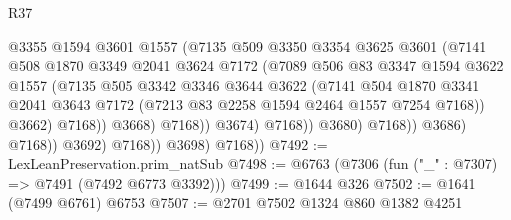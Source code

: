 \begin{lexlean}{R37}
\begin{coremodule}
                                      @3355
                                      @1594
                                      @3601
                                      @1557
                                      (@7135
                                        @509
                                        @3350
                                        @3354
                                        @3625
                                        @3601
                                        (@7141
                                          @508
                                          @1870
                                          @3349
                                          @2041
                                          @3624
                                          @7172
                                          (@7089
                                            @506
                                            @83
                                            @3347
                                            @1594
                                            @3622
                                            @1557
                                            (@7135
                                              @505
                                              @3342
                                              @3346
                                              @3644
                                              @3622
                                              (@7141
                                                @504
                                                @1870
                                                @3341
                                                @2041
                                                @3643
                                                @7172
                                                (@7213 @83 @2258 @1594 @2464 @1557 @7254 @7168))
                                              @3662)
                                            @7168))
                                        @3668)
                                      @7168))
                                  @3674)
                                @7168))
                            @3680)
                          @7168))
                      @3686)
                    @7168))
                @3692)
              @7168))
          @3698)
        @7168))
@7492 := LexLeanPreservation.prim_natSub
@7498 := @6763 (@7306 (fun ("_" : @7307) => @7491 (@7492 @6773 @3392)))
@7499 := @1644 @326
@7502 := @1641 (@7499 @6761) @6753
@7507 := @2701 @7502 @1324 @860 @1382 @4251

\end{coremodule}
\end{lexlean}
